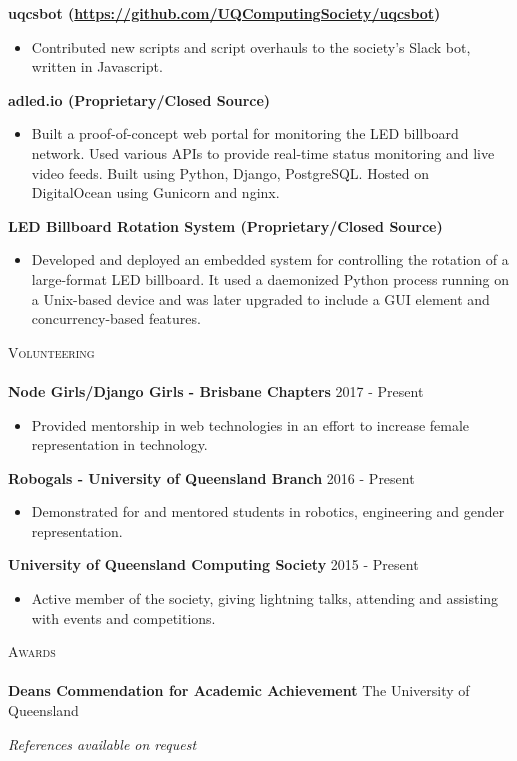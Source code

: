 \documentclass[a4paper]{article}
\newcommand{\lineunder} {
    \vspace*{-8pt} \\
    \hspace*{-18pt} \hrulefill \\
}
\newcommand{\header} [1] {
    {\hspace*{-18pt}\vspace*{6pt} \textsc{#1}}
    \vspace*{-6pt} \lineunder
}
\newenvironment{singleitem}
{   \small
    \vspace{-2.6pt}
    \begin{itemize}
    \setlength{\itemsep}{0pt}
    \setlength{\parskip}{0pt}
    \setlength{\parsep}{0pt}   }
{\end{itemize} \vspace{-2.6pt}	}
\begin{document}
\textbf{uqcsbot (\href{https://github.com/UQComputingSociety/uqcsbot}{https://github.com/UQComputingSociety/uqcsbot})}
\begin{singleitem}
	\item Contributed new scripts and script overhauls to the society's Slack bot, written in Javascript.
\end{singleitem}

\textbf{adled.io (Proprietary/Closed Source)}
\begin{singleitem}
	\item Built a proof-of-concept web portal for monitoring the LED billboard network. Used various APIs to provide real-time status monitoring and live video feeds. Built using Python, Django, PostgreSQL. Hosted on DigitalOcean using Gunicorn and nginx.
\end{singleitem}

\textbf{LED Billboard Rotation System (Proprietary/Closed Source)}
\begin{singleitem}
	\item Developed and deployed an embedded system for controlling the rotation of a large-format LED billboard. It used a daemonized Python process running on a Unix-based device and was later upgraded to include a GUI element and concurrency-based features.
\end{singleitem}

\vspace{1mm}

\header{Volunteering}
\vspace{1mm}
\textbf{Node Girls/Django Girls - Brisbane Chapters} \hfill 2017 - Present\\
\begin{singleitem}
	\item Provided mentorship in web technologies in an effort to increase female representation in technology.
\end{singleitem}
\textbf{Robogals - University of Queensland Branch} \hfill 2016 - Present\\
\begin{singleitem}
	\item Demonstrated for and mentored students in robotics, engineering and gender representation.
\end{singleitem}
\textbf{University of Queensland Computing Society} \hfill 2015 - Present\\
\begin{singleitem}
	\item Active member of the society, giving lightning talks, attending and assisting with events and competitions.
\end{singleitem}

\vspace{1mm}

\header{Awards}
\textbf{Dean\textquotesingle{}s Commendation for Academic Achievement} \hfill The University of Queensland\\

\vspace{1mm}

\begin{center}
\small \textit{References available on request}
\end{center}
\end{document}
